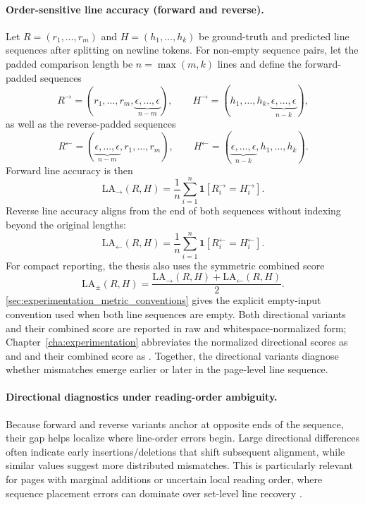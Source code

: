 \paragraph{Order-sensitive line accuracy (forward and reverse).}
Let $R=(r_1,\dots,r_{m})$ and $H=(h_1,\dots,h_{k})$ be ground-truth and predicted line sequences after splitting on newline tokens. For non-empty sequence pairs, let the padded comparison length be $n=\max(m,k)$ lines and define the forward-padded sequences
\[
R^{\rightarrow}=(r_1,\dots,r_m,\underbrace{\epsilon,\dots,\epsilon}_{n-m}),\qquad
H^{\rightarrow}=(h_1,\dots,h_k,\underbrace{\epsilon,\dots,\epsilon}_{n-k}),
\]
as well as the reverse-padded sequences
\[
R^{\leftarrow}=(\underbrace{\epsilon,\dots,\epsilon}_{n-m},r_1,\dots,r_m),\qquad
H^{\leftarrow}=(\underbrace{\epsilon,\dots,\epsilon}_{n-k},h_1,\dots,h_k).
\]
Forward line accuracy is then
\begin{equation}
\mathrm{LA}_{\rightarrow}(R,H)=\frac{1}{n}\sum_{i=1}^{n}\mathbf{1}\!\left[R^{\rightarrow}_i=H^{\rightarrow}_i\right].
\label{eq:line_accuracy_forward}
\end{equation}
Reverse line accuracy aligns from the end of both sequences without indexing beyond the original lengths:
\begin{equation}
\mathrm{LA}_{\leftarrow}(R,H)=\frac{1}{n}\sum_{i=1}^{n}\mathbf{1}\!\left[R^{\leftarrow}_i=H^{\leftarrow}_i\right].
\label{eq:line_accuracy_reverse}
\end{equation}
For compact reporting, the thesis also uses the symmetric combined score
\[
\mathrm{LA}_{\pm}(R,H)=\frac{\mathrm{LA}_{\rightarrow}(R,H)+\mathrm{LA}_{\leftarrow}(R,H)}{2}.
\]
\autoref{sec:experimentation_metric_conventions} gives the explicit empty-input convention used when both line sequences are empty. Both directional variants and their combined score are reported in raw and whitespace-normalized form; Chapter~\ref{cha:experimentation} abbreviates the normalized directional scores as \LANormForward{} and \LANormReverse{} and their combined score as \LANormCombined. Together, the directional variants diagnose whether mismatches emerge earlier or later in the page-level line sequence.

\paragraph{Directional diagnostics under reading-order ambiguity.}
Because forward and reverse variants anchor at opposite ends of the sequence, their gap helps localize where line-order errors begin. Large directional differences often indicate early insertions/deletions that shift subsequent alignment, while similar values suggest more distributed mismatches. This is particularly relevant for pages with marginal additions or uncertain local reading order, where sequence placement errors can dominate over set-level line recovery .

